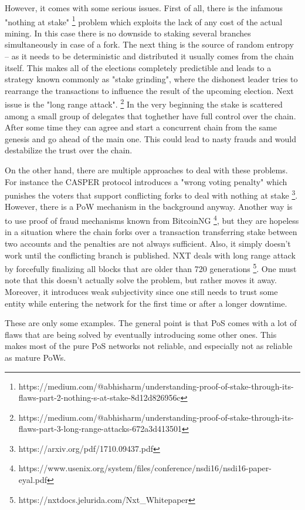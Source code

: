 However, it comes with some serious issues. First of all, there is the infamous "nothing at stake"
\footnote{https://medium.com/@abhisharm/understanding-proof-of-stake-through-its-flaws-part-2-nothing-s-at-stake-8d12d826956c}
problem which exploits the lack of any cost of the actual mining. In this case
there is no downside to staking several branches simultaneously in case of a fork.
The next thing is the source of random entropy – as it needs to be deterministic
and distributed it usually comes from the chain itself. This
makes all of the elections completely predictible and leads to a strategy known
commonly as "stake grinding", where the dishonest leader tries to rearrange the
transactions to influence the result of the upcoming election. Next issue is the
"long range attack".
\footnote{https://medium.com/@abhisharm/understanding-proof-of-stake-through-its-flaws-part-3-long-range-attacks-672a3d413501}
In the very beginning the stake is scattered among a small
group of delegates that toghether have full control over the chain. After
some time they can agree and start a concurrent chain from the same genesis
and go ahead of the main one. This could lead to nasty frauds and would
destabilize the trust over the chain.

On the other hand, there are multiple approaches to deal with these problems. For instance
the CASPER protocol introduces a "wrong voting penalty" which punishes the
voters that support conflicting forks to deal with nothing at stake
\footnote{https://arxiv.org/pdf/1710.09437.pdf}.
However, there is a PoW mechanism in the background anyway. Another way is to use
proof of fraud mechanisms known from BitcoinNG
\footnote{https://www.usenix.org/system/files/conference/nsdi16/nsdi16-paper-eyal.pdf},
but they are hopeless in a situation where the chain forks over a transaction
transferring stake between two accounts and the penalties are not always
sufficient. Also, it simply doesn't work until the
conflicting branch is published. NXT deals with long range attack by forcefully
finalizing all blocks that are older than 720 generations
\footnote{https://nxtdocs.jelurida.com/Nxt\_Whitepaper}.
One must note that this doesn't actually solve the problem, but rather moves it
away. Moreover, it introduces weak subjectivity since one still needs to trust
some entity while entering the network for the first time or after a longer downtime.

These are only some examples. The general point is that PoS comes with a lot
of flaws that are being solved by eventually introducing some other ones. This
makes most of the pure PoS networks not reliable, and especially not as reliable
as mature PoWs.
